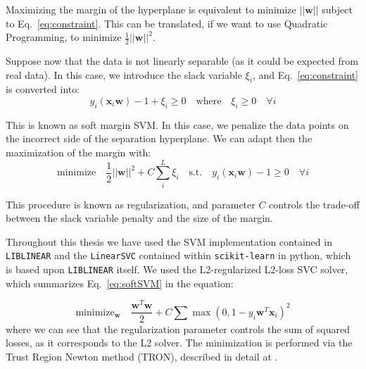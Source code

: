 Maximizing the margin of the hyperplane is equivalent to minimize $||\mathbf{w}||$ subject to Eq.~\ref{eq:constraint}. This can be translated, if we want to use Quadratic Programming, to minimize $\frac{1}{2}||\mathbf{w}||^2$. 

Suppose now that the data is not linearly separable (as it could be expected from real data). In this case, we introduce the slack variable $\xi_i$, and Eq.~\ref{eq:constraint} is converted into: 
\begin{equation}
y_i(\mathbf{x}_i\mathbf{w})-1 + \xi_i \ge 0 \quad \text{where} \quad \xi_i\ge 0 \quad\forall i
\end{equation}

This is known as soft margin \ac{SVM}. In this case, we penalize the data points on the incorrect side of the separation hyperplane. We can adapt then the maximization of the margin with: 
\begin{equation}\label{eq:softSVM}
	\text{minimize} \quad \frac{1}{2}||\mathbf{w}||^2 + C \sum_i^L \xi_i \quad \text{s.t.} \quad y_i(\mathbf{x}_i\mathbf{w})-1\ge 0 \quad \forall i
\end{equation}

This procedure is known as regularization, and parameter $C$ controls the trade-off between the slack variable penalty and the size of the margin.

Throughout this thesis we have used the \ac{SVM} implementation contained in \texttt{LIBLINEAR} \cite{Chang2001} and the \texttt{LinearSVC} contained within \texttt{scikit-learn} in python, which is based upon \texttt{LIBLINEAR} itself. We used the L2-regularized L2-loss \ac{SVC} solver, which summarizes Eq.~\ref{eq:softSVM} in the equation: 

\begin{equation}
\text{minimize}_\mathbf{w}\quad  \frac{\mathbf{w}^T\mathbf{w}}{2} + C \sum \max(0, 1- y_i \mathbf{w}^T\mathbf{x}_i)^2
\end{equation}
where we can see that the regularization parameter controls the sum of squared losses, as it corresponds to the L2 solver. The minimization is performed via the Trust Region Newton method (TRON), described in detail at \cite{Lin2008}.

